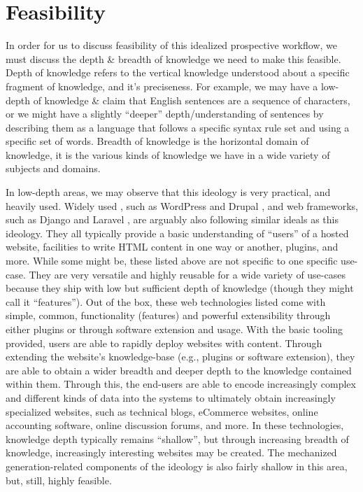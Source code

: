 \section{Feasibility}
\label{sec:idlgy:feasibility}

In order for us to discuss feasibility of this idealized prospective workflow,
we must discuss the depth \& breadth of knowledge we need to make this feasible.
Depth of knowledge refers to the vertical knowledge understood about a specific
fragment of knowledge, and it's preciseness. For example, we may have a
low-depth of knowledge \& claim that English sentences are a sequence of
characters, or we might have a slightly ``deeper'' depth/understanding  of
sentences by describing them as a language that follows a specific syntax rule
set and using a specific set of words. Breadth of knowledge is the horizontal
domain of knowledge, it is the various kinds of knowledge we have in a wide
variety of subjects and domains.

In low-depth areas, we may observe that this ideology is very practical, and
heavily used. Widely used , such as WordPress \cite{WordPress} and
Drupal \cite{Drupal}, and web frameworks, such as Django \cite{Django} and
Laravel \cite{Laravel}, are arguably also following similar ideals as this
ideology. They all typically provide a basic understanding of ``users'' of a
hosted website, facilities to write HTML content in one way or another, plugins,
and more. While some might be, these listed above are not specific to one
specific use-case. They are very versatile and highly reusable for a wide
variety of use-cases because they ship with low but sufficient depth of
knowledge (though they might call it ``features''). Out of the box, these web
technologies listed come with simple, common, functionality (features) and
powerful extensibility through either plugins or through software extension and
usage. With the basic tooling provided, users are able to rapidly deploy
websites with content. Through extending the website's knowledge-base (e.g.,
plugins or software extension), they are able to obtain a wider breadth and
deeper depth to the knowledge contained within them. Through this, the end-users
are able to encode increasingly complex and different kinds of data into the
systems to ultimately obtain increasingly specialized websites, such as
technical blogs, eCommerce websites, online accounting software, online
discussion forums, and more. In these technologies, knowledge depth typically
remains ``shallow'', but through increasing breadth of knowledge, increasingly
interesting websites may be created. The mechanized generation-related
components of the ideology is also fairly shallow in this area, but, still,
highly feasible.

